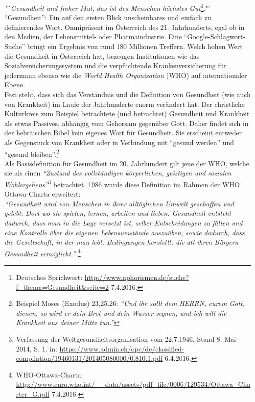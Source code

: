 \documentclass[
    a4paper,
    12pt,
    hyphens,
    chapterprefix=true,
    headheight=33pt,
    footheight=29pt,
    headings=optiontohead, %
]{scrartcl}
\begin{document}
\textit{"`Gesundheit und froher Mut, das ist des Menschen höchstes Gut}\footnote{Deutsches Sprichwort: \url{http://www.aphorismen.de/suche?f_thema=Gesundheit&seite=2} 7.4.2016.}."'\\ "`Gesundheit"': Ein auf den ersten Blick unscheinbares und einfach zu definierendes Wort.
Omnipräsent im Österreich des 21. Jahrhunderts, egal ob in den Medien, der Lebensmittel- oder Pharmaindustrie. Eine "`Google-Schlagwort-Suche"' bringt ein Ergebnis von rund 180 Millionen Treffern. Welch hohen Wert die Gesundheit in Österreich hat, bezeugen Institutionen wie das Sozialversicherungssystem und die verpflichtende
Krankenversicherung für jedermann ebenso wie die \textit{World Health Organisation} (WHO) auf internationaler Ebene.\\
Fest steht, dass sich das Verständnis und die Definition von Gesundheit (wie auch von Krankheit) im Laufe der Jahrhunderte enorm verändert hat. Der christliche Kulturkreis zum Beispiel betrachtete (und betrachtet) Gesundheit und Krankheit als etwas Passives, abhängig vom Gehorsam gegenüber Gott. Daher findet sich in der hebräischen Bibel kein eigenes Wort für Gesundheit. Sie erscheint entweder als Gegenstück von Krankheit oder in Verbindung mit "`gesund werden"' und "`gesund bleiben"'.\footnote{Beispiel Moses (Exodus) 23,25.26: \textit{"`Und ihr sollt dem HERRN, eurem Gott, dienen, so wird er dein Brot und dein Wasser segnen; und ich will die Krankheit aus deiner Mitte tun."'}} \\
Als Basisdefinition für Gesundheit im 20. Jahrhundert gilt jene der WHO, welche sie als einen \textit{"`Zustand des vollständigen körperlichen, geistigen und sozialen Wohlergehens"'}\footnote{Verfassung der Weltgesundheitsorganisation vom 22.7.1946, Stand 8. Mai 2014,
S. 1. in: \url{https://www.admin.ch/opc/de/classified-compilation/19460131/201405080000/0.810.1.pdf} 6.4.2016.} betrachtet. 1986 wurde diese Definition im Rahmen der WHO Ottawa-Charta erweitert:\\
\textit{"`Gesundheit wird von Menschen in ihrer alltäglichen Umwelt geschaffen und gelebt: Dort wo sie spielen, lernen, arbeiten und lieben. Gesundheit entsteht dadurch, dass man in die Lage versetzt ist, selber Entscheidungen zu fällen und eine Kontrolle über die eigenen Lebensumstände auszuüben, sowie dadurch, dass die Gesellschaft, in
der man lebt, Bedingungen herstellt, die all ihren Bürgern Gesundheit ermöglicht."'}
\footnote{WHO-Ottawa-Charta: \url{http://www.euro.who.int/__data/assets/pdf_file/0006/129534/Ottawa_Charter_G.pdf} 7.4.2016.}\\
\end{document}
